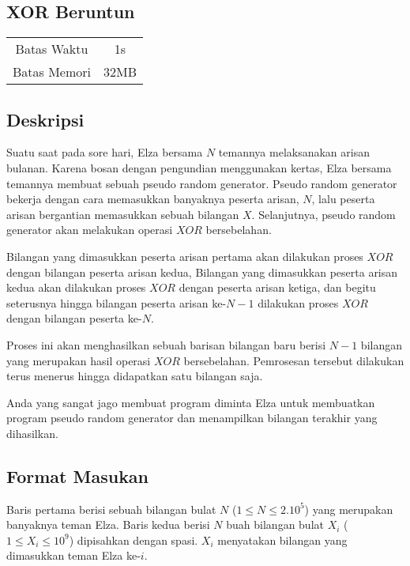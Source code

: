 \documentclass{article}
\begin{document}
\begin{center}
    \section*{XOR Beruntun} %

    \begin{tabular}{ | c c | }
        \hline
        Batas Waktu  & 1s \\    %
        Batas Memori & 32MB \\  %
        \hline
    \end{tabular}
\end{center}

\subsection*{Deskripsi}

Suatu saat pada sore hari, Elza bersama $N$ temannya melaksanakan arisan bulanan.
Karena bosan dengan pengundian menggunakan kertas, Elza bersama temannya membuat sebuah pseudo random generator.
Pseudo random generator bekerja dengan cara memasukkan banyaknya peserta arisan, $N$, lalu peserta arisan bergantian memasukkan sebuah bilangan $X$.
Selanjutnya, pseudo random generator akan melakukan operasi $XOR$ bersebelahan.

Bilangan yang dimasukkan peserta arisan pertama akan dilakukan proses $XOR$ dengan bilangan peserta arisan kedua, 
Bilangan yang dimasukkan peserta arisan kedua akan dilakukan proses $XOR$ dengan peserta arisan ketiga, 
dan begitu seterusnya hingga bilangan peserta arisan ke-$N - 1$ dilakukan proses $XOR$ dengan bilangan peserta ke-$N$.

Proses ini akan menghasilkan sebuah barisan bilangan baru berisi $N - 1$ bilangan yang merupakan hasil operasi $XOR$ bersebelahan. 
Pemrosesan tersebut dilakukan terus menerus hingga didapatkan satu bilangan saja.

Anda yang sangat jago membuat program diminta Elza untuk membuatkan program pseudo random generator dan menampilkan bilangan terakhir yang dihasilkan.

\subsection*{Format Masukan}

Baris pertama berisi sebuah bilangan bulat $N$ ($1 \leq N \leq 2.10^5$) yang merupakan banyaknya teman Elza.
Baris kedua berisi $N$ buah bilangan bulat $X_i$ ($1 \leq X_i \leq 10^9$) dipisahkan dengan spasi. $X_i$ menyatakan bilangan yang dimasukkan teman Elza ke-$i$.
\end{document}
